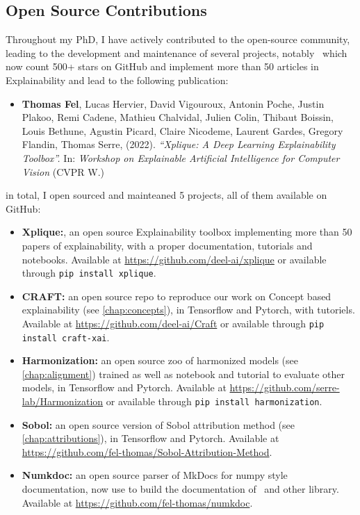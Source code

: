 \subsection{Open Source Contributions}
\label{sec:open-source-contributions}

Throughout my PhD, I have actively contributed to the open-source community, leading to the development and maintenance of several projects, notably \xplique~which now count 500+ stars on GitHub and implement more than 50 articles in Explainability and lead to the following publication:

\begin{itemize}
    \item \textbf{Thomas Fel}\equal, Lucas Hervier\equal, David Vigouroux, Antonin Poche, Justin Plakoo, Remi Cadene, Mathieu Chalvidal, Julien Colin, Thibaut Boissin, Louis Bethune, Agustin Picard, Claire Nicodeme, Laurent Gardes, Gregory Flandin, Thomas Serre, (2022). \textit{``Xplique: A Deep Learning Explainability Toolbox''.} In: \textit{Workshop on Explainable Artificial Intelligence for Computer Vision} (\textcolor{confcolor}{CVPR} W.)
\end{itemize}


in total, I open sourced and mainteaned 5 projects, all of them available on GitHub:
\begin{itemize}

    \item \textbf{Xplique:}, an open source Explainability toolbox implementing more than 50 papers of explainability, with a proper documentation, tutorials and notebooks. Available at \url{https://github.com/deel-ai/xplique} or available through \lstinline[language=bash]{pip install xplique}.

    \item \textbf{CRAFT:} an open source repo to reproduce our work on Concept based explainability (see \autoref{chap:concepts}), in Tensorflow and Pytorch, with tutoriels. Available at \url{https://github.com/deel-ai/Craft} or available through \lstinline[language=bash]{pip install craft-xai}.

    \item \textbf{Harmonization:} an open source zoo of harmonized models (see \autoref{chap:alignment}) trained as well as notebook and tutorial to evaluate other models, in Tensorflow and Pytorch. Available at \url{https://github.com/serre-lab/Harmonization} or available through \lstinline[language=bash]{pip install harmonization}.

    \item \textbf{Sobol: } an open source version of Sobol attribution method (see \autoref{chap:attributions}), in Tensorflow and Pytorch. Available at \url{ https://github.com/fel-thomas/Sobol-Attribution-Method}.

    \item \textbf{Numkdoc:} an open source parser of MkDocs for numpy style documentation, now use to build the documentation of \xplique~and other library. Available at \url{ https://github.com/fel-thomas/numkdoc}.

\end{itemize}

